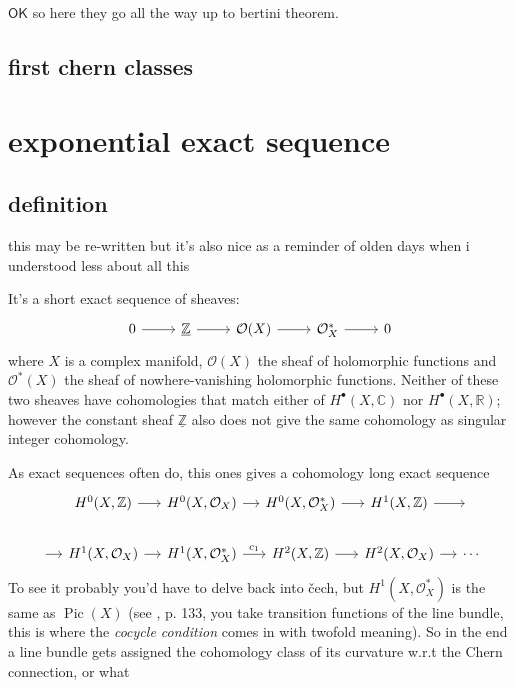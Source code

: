 \(\mathsf{OK}\) so here they go all the way up to bertini theorem.

\subsection{first chern classes}


\section{exponential exact sequence}

\subsection{definition}

this may be re-written but it's also nice as a reminder of olden days when i understood less about all this

It's a short exact sequence of sheaves:
\[\begin{tikzcd}0\arrow[r]&\underline{\mathbb{Z}}\arrow[r]&\mathcal{O}(X)\arrow[r]&\mathcal{O}^*_X\arrow[r]&0\end{tikzcd}\]
where \(X\) is a complex manifold, \(\mathcal{O}(X)\) the sheaf of holomorphic functions and \(\mathcal{O} ^*(X)\) the sheaf of nowhere-vanishing holomorphic functions. Neither of these two sheaves have cohomologies that match either of \(H^{\bullet}(X,\mathbb{C})\) nor \(H^{\bullet}(X,\mathbb{R})\); however the constant sheaf \(\underline{\mathbb{Z}}\) also does not give the same cohomology as singular integer cohomology.

As exact sequences often do, this ones gives a cohomology long exact sequence
\[\begin{tikzcd}[column sep=small]
	\leavevmode&H^{0}(X,\mathbb{Z})\arrow[r]&H^{0}(X,\mathcal{O}_X)\arrow[r]&H^{0}(X,\mathcal{O}_X^*)\arrow[r]&H^{1}(X,\mathbb{Z})\arrow[r]& \leavevmode\\
	\arrow[r]&H^{1}(X,\mathcal{O}_X)\arrow[r]&H^{1}(X,\mathcal{O}_X^*)\arrow[r,"c_1"]&H^{2}(X,\mathbb{Z})\arrow[r]&H^{2}(X,\mathcal{O}_X)\arrow[r]&\cdots
\end{tikzcd}\]
To see it probably you'd have to delve back into \v cech, but \(H^{1}(X,\mathcal{O}_X^*)\) is the same as \(\operatorname{Pic}(X)\) (see \cite{gri}, p. 133, you take transition functions of the line bundle, this is where the \textit{cocycle condition} comes in with twofold meaning). So in the end a line bundle gets assigned the cohomology class of its curvature w.r.t the Chern connection, or what

